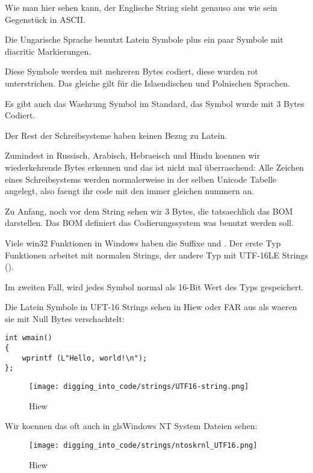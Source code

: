 Wie man hier sehen kann, der Englische String sieht genauso aus wie sein Gegenstück in ASCII.

Die Ungarische Sprache benutzt Latein Symbole plus ein paar Symbole mit diacritic Markierungen.

Diese Symbole werden mit mehreren Bytes codiert, diese wurden rot unterstrichen.
Das gleiche gilt für die Islaendischen und Polnischen Sprachen.

Es gibt auch das  Waehrung Symbol im Standard, das Symbol wurde mit 3 Bytes Codiert.

Der Rest der Schreibsysteme haben keinen Bezug zu Latein.

Zumindest in Russisch, Arabisch, Hebraeisch und Hindu koennen wir wiederkehrende Bytes erkennen und das ist nicht mal überraschend:
Alle Zeichen eines Schreibsystems werden normalerweise in der selben Unicode Tabelle angelegt, also faengt ihr code mit den 
immer gleichen nummern an. %

Zu Anfang, noch vor dem  String sehen wir 3 Bytes, die tatsaechlich das \ac{BOM} darstellen.
Das \ac{BOM} definiert das Codierungssystem was benutzt werden soll.


Viele win32 Funktionen in Windows haben die Suffixe  und . 
Der erste Typ Funktionen arbeitet mit normalen Strings, der andere Typ mit 
UTF-16LE Strings (). 

Im zweiten Fall, wird jedes Symbol normal als 16-Bit Wert des Typs  gespeichert.

Die Latein Symbole in UFT-16 Strings sehen in Hiew oder FAR aus als waeren sie mit Null Bytes verschachtelt:

\begin{lstlisting}[style=customc]
int wmain()
{
	wprintf (L"Hello, world!\n");
};
\end{lstlisting}

\begin{figure}[H]
\centering
\texttt{[image: digging\_into\_code/strings/UTF16-string.png]}
\caption{Hiew}
\end{figure}

Wir koennen das oft auch in gls{Windows NT} System Dateien sehen:

\begin{figure}[H]
\centering
\texttt{[image: digging\_into\_code/strings/ntoskrnl\_UTF16.png]}
\caption{Hiew}
\end{figure}

